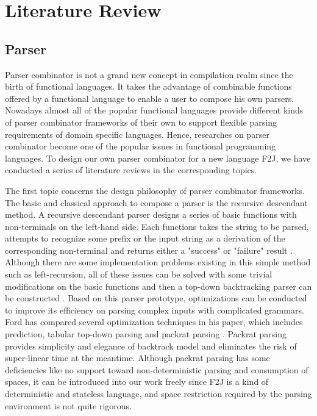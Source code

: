 \chapter{Literature Review}

\section{Parser}

Parser combinator is not a grand new concept in compilation realm since the birth of functional languages. It takes the advantage of combinable functions offered by a functional language to enable a user to compose his own parsers. Nowadays almost all of the popular functional languages provide different kinds of parser combinator frameworks of their own to support flexible parsing requirements of domain specific languages. Hence, researches on parser combinator become one of the popular issues in functional programming languages. To design our own parser combinator for a new language F2J, we have conducted a series of literature reviews in the corresponding topics.

The first topic concerns the design philosophy of parser combinator frameworks. The basic and classical approach to compose a parser is the recursive descendant method. A recursive descendant parser designs a series of basic functions with non-terminals on the left-hand side. Each functions takes the string to be parsed, attempts to recognize some prefix or the input string as a derivation of the corresponding non-terminal and returns either a "success" or "failure" result \cite{Ford2002}. Although there are some implementation problems existing in this simple method such as left-recursion, all of these issues can be solved with some trivial modifications on the basic functions and then a top-down backtracking parser can be constructed \cite{Compilers:2006}. Based on this parser prototype, optimizations can be conducted to improve its efficiency on parsing complex inputs with complicated grammars. Ford has compared several optimization techniques in his paper, which includes prediction, tabular top-down parsing and packrat parsing \cite{Ford2002}. Packrat parsing provides simplicity and elegance of backtrack model and eliminates the risk of super-linear time at the meantime. Although packrat parsing has some deficiencies like no support toward non-deterministic parsing and consumption of spaces, it can be introduced into our work freely since F2J is a kind of deterministic and stateless language, and space restriction required by the parsing environment is not quite rigorous.


